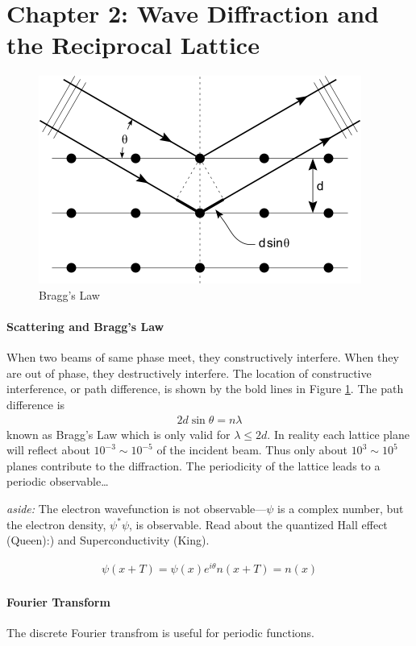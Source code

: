 \documentclass[../main.tex]{subfiles}
\begin{document}
\pagestyle{fancy}

\section*{Chapter 2: Wave Diffraction and the Reciprocal Lattice}

\begin{figure}[ht]
    \centering
    \includegraphics[width=0.4\linewidth]{bragg.png}
    \caption{Bragg's Law}
    \label{fig:2.1}
\end{figure}

\paragraph{Scattering and Bragg's Law}

When two beams of same phase meet, they constructively interfere. When they are out of phase, they
destructively interfere. The location of constructive interference, or path difference, is shown
by the bold lines in Figure \ref{fig:2.1}. The path difference is
\begin{align*}
    2d \sin \theta = n \lambda
\end{align*}
known as Bragg's Law which is only valid for $\lambda \leq 2d$. In reality each lattice plane will
reflect about $10^{-3} \sim 10^{-5}$ of the incident beam. Thus only about $10^3 \sim 10^5$ planes
contribute to the diffraction. The periodicity of the lattice leads to a periodic observable\dots

\emph{aside:} The electron wavefunction is not observable---$\psi$ is a complex number, but the
electron density, $\psi^* \psi$, is observable. Read about the quantized Hall effect (Queen):) and
Superconductivity (King).

\begin{align*}
    \psi(x + T) = \psi(x) e^{i\theta}
    n(x + T) = n(x)
\end{align*}

\paragraph{Fourier Transform} The discrete Fourier transfrom is useful for periodic functions.
\end{document}
